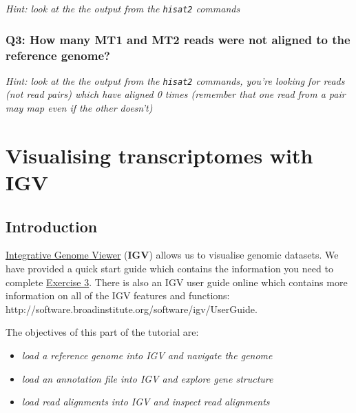 \documentclass[11pt]{article}
\providecommand{\tightlist}{%
      \setlength{\itemsep}{0pt}\setlength{\parskip}{0pt}}
\begin{document}
\textit{Hint: look at the the output from the \texttt{hisat2} commands}

\hypertarget{q3-how-many-mt1-and-mt2-reads-were-not-aligned-to-the-reference-genome}{%
\subsubsection{Q3: How many MT1 and MT2 reads were not aligned to the
reference
genome?}\label{q3-how-many-mt1-and-mt2-reads-were-not-aligned-to-the-reference-genome}}

\textit{Hint: look at the the output from the \texttt{hisat2} commands,
you're looking for reads (not read pairs) which have aligned 0 times
(remember that one read from a pair may map even if the other doesn't)}


\newpage

    \hypertarget{visualising-transcriptomes-with-igv}{%
\section{Visualising transcriptomes with
IGV}\label{visualising-transcriptomes-with-igv}}

    \hypertarget{introduction}{%
\subsection{Introduction}\label{introduction}}

\href{https://software.broadinstitute.org/software/igv/}{Integrative
Genome Viewer} (\textbf{IGV}) allows us to visualise genomic datasets.
We have provided a quick start guide which contains the information you
need to complete \hyperref[exercise-3]{Exercise 3}. There is also an IGV
user guide online which contains more information on all of the IGV
features and functions:
http://software.broadinstitute.org/software/igv/UserGuide.

The objectives of this part of the tutorial are:

\begin{itemize}
\tightlist
\item
  \textit{load a reference genome into IGV and navigate the genome}
\item
  \textit{load an annotation file into IGV and explore gene structure}
\item
  \textit{load read alignments into IGV and inspect read alignments}
\end{itemize}
\end{document}
